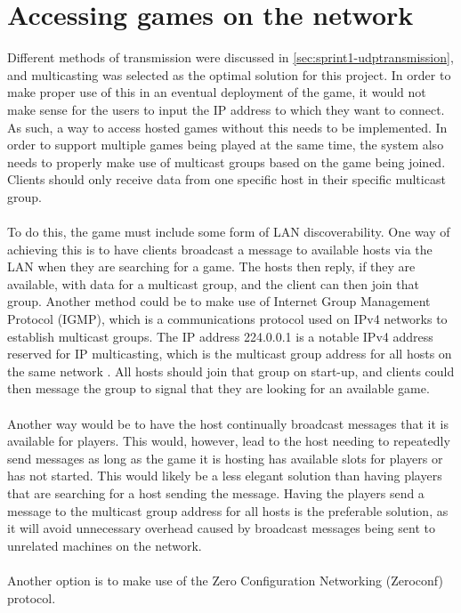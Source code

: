 \section{Accessing games on the network}\label{sec:accessonnetwork}
Different methods of transmission were discussed in \autoref{sec:sprint1-udptransmission}, and multicasting was selected as the optimal solution for this project.
In order to make proper use of this in an eventual deployment of the game, it would not make sense for the users to input the IP address to which they want to connect.
As such, a way to access hosted games without this needs to be implemented.
In order to support multiple games being played at the same time, the system also needs to properly make use of multicast groups based on the game being joined.
Clients should only receive data from one specific host in their specific multicast group.
\\\\
To do this, the game must include some form of LAN discoverability.
One way of achieving this is to have clients broadcast a message to available hosts via the LAN when they are searching for a game.
The hosts then reply, if they are available, with data for a multicast group, and the client can then join that group.
Another method could be to make use of Internet Group Management Protocol (IGMP), which is a communications protocol used on IPv4 networks to establish multicast groups.
The IP address 224.0.0.1 is a notable IPv4 address reserved for IP multicasting, which is the multicast group address for all hosts on the same network \cite{ipv4multicastaddresses}.
All hosts should join that group on start-up, and clients could then message the group to signal that they are looking for an available game.
\\\\
Another way would be to have the host continually broadcast messages that it is available for players.
This would, however, lead to the host needing to repeatedly send messages as long as the game it is hosting has available slots for players or has not started.
This would likely be a less elegant solution than having players that are searching for a host sending the message.
Having the players send a message to the multicast group address for all hosts is the preferable solution, as it will avoid unnecessary overhead caused by broadcast messages being sent to unrelated machines on the network.
\\\\
Another option is to make use of the Zero Configuration Networking (Zeroconf) protocol.
